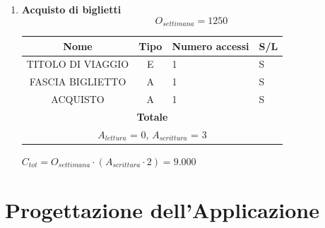 \documentclass[12pt,a4paper]{report}
\begin{document}
\begin{enumerate}[label=\textbf{\arabic*)}]
    \item \textbf{Acquisto di biglietti} \\
    \[ {O_{settimana} = 1250} \]
    \begin{table}[H]
    \centering
    \begin{tabular}{|c|c|l|l|}
    \hline
    \textbf{Nome} & \textbf{Tipo} & \textbf{Numero accessi} & \textbf{S/L} \\
    \hline
    TITOLO DI VIAGGIO & E & 1 & S \\
    \hline
    FASCIA BIGLIETTO & A & 1 & S \\
    \hline
    ACQUISTO & A & 1 & S \\
    \hline
    \multicolumn{4}{c}{\textbf{Totale}} \\    
    \multicolumn{4}{c}{${A_{lettura}}$ = 0, ${A_{scrittura}}$ = 3} \\
    \hline
    \end{tabular}
    \end{table}
    \begin{center}
    ${C_{tot} = {O_{settimana}}\cdot({A_{scrittura}}\cdot 2) = 9.000}$
    \end{center}

\end{enumerate}

\chapter{Progettazione dell'Applicazione}
\end{document}

